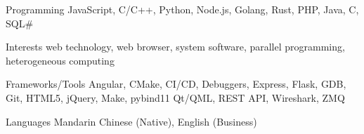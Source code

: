 
\begin{cvskills}
    \cvskill
    {Programming} %
    {JavaScript, C/C++, Python, Node.js, Golang, Rust, PHP, Java, C, SQL\#} %
    
    \cvskill
    {Interests} %
    {web technology, web browser, system software, parallel programming, heterogeneous computing} %

      \cvskill
        {Frameworks/Tools} %
        {Angular, CMake, CI/CD, Debuggers, Express, Flask, GDB, Git, HTML5, jQuery, Make, pybind11 \newline
        Qt/QML, REST API, Wireshark, ZMQ
        } %

      \cvskill
        {Languages} %
        {Mandarin Chinese (Native), English (Business)} %
    
\end{cvskills}
